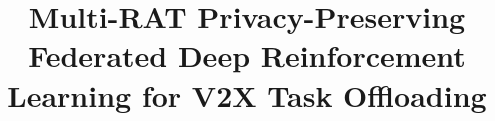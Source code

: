\documentclass[journal,10pt,twocolumn]{IEEEtran}
\begin{document}
\title{Multi-RAT Privacy-Preserving Federated Deep Reinforcement Learning for V2X Task Offloading}

\maketitle














\end{document}
